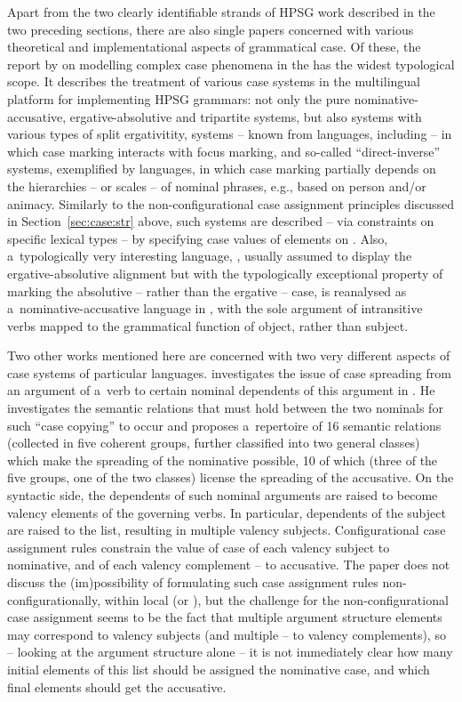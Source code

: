 \documentclass[output=paper]{langsci/langscibook}
\begin{document}
Apart from the two clearly identifiable strands of HPSG work described in the two preceding sections, there are also single papers concerned with various theoretical and implementational aspects of grammatical case.  Of these, the report by \citealt{drel:08} on modelling complex case phenomena in the  \citep{BFO2002a-u} has the widest typological scope.  It describes the treatment of various case systems in the multilingual platform for implementing HPSG grammars: not only the pure nominative-accusative, ergative-absolutive and tripartite systems, but also systems with various types of split ergativitity, systems – known from  languages, including  – in which case marking interacts with focus marking, and so-called “direct-inverse” systems, exemplified by  languages, in which case marking partially depends on the hierarchies – or scales – of nominal phrases, e.g., based on person and/or animacy.  Similarly to the non-configurational case assignment principles discussed in Section~\ref{sec:case:str} above, such systems are described – via constraints on specific lexical types – by specifying case values of elements on .  Also, a~typologically very interesting language, , usually assumed to display the ergative-absolutive alignment but with the typologically exceptional property of marking the absolutive – rather than the ergative – case, is reanalysed as a~nominative-accusative language in \citealt{crys:09}, with the sole argument of intransitive verbs mapped to the grammatical function of object, rather than subject.

Two other works mentioned here are concerned with two very different aspects of case systems of particular languages.  \citealt{ryu:13} investigates the issue of case spreading from an argument of a~verb to certain nominal dependents of this argument in .  He investigates the semantic relations that must hold between the two nominals for such “case copying” to occur and proposes a~repertoire of 16 semantic relations (collected in five coherent groups, further classified into two general classes) which make the spreading of the nominative possible, 10 of which (three of the five groups, one of the two classes) license the spreading of the accusative.  On the syntactic side, the dependents of such nominal arguments are raised to become valency elements of the governing verbs.  In particular, dependents of the subject are raised to the  list, resulting in multiple valency subjects.  Configurational case assignment rules constrain the value of case of each valency subject to nominative, and of each valency complement – to accusative.  The paper does not discuss the (im)possibility of formulating such case assignment rules non-configurationally, within local  (or ), but the challenge for the non-configurational case assignment seems to be the fact that multiple argument structure elements may correspond to valency subjects (and multiple – to valency complements), so – looking at the argument structure alone – it is not immediately clear how many initial elements of this list should be assigned the nominative case, and which final elements should get the accusative.
\end{document}
